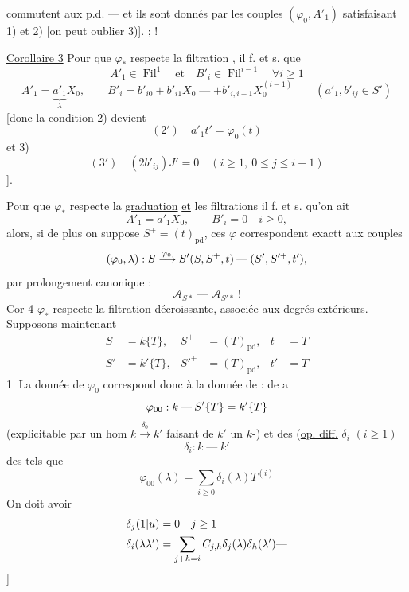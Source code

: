 commutent aux p.d. --- et ils sont donnés par les couples $(\varphi_0,A'_1)$ satisfaisant 1) et 2) [on peut oublier 3)]. ;  !

\uline{Corollaire 3} Pour que $\varphi_*$ respecte la filtration , il f. et s. que
\[
 A'_1\in\operatorname{Fil}^{1}\quad\text{et}\quad B'_i\in\operatorname{Fil}^{i-1}\quad\forall i\geq1
\]
\[
 A'_1=\underbrace{a'_1}_{\lambda}X_0,\qquad
 B'_i=b'_{i0}+b'_{i1}X_0\mathbin{\text{---}}+b'_{i,i-1}X_0^{(i-1)}
 \qquad(a'_1,b'_{ij}\in S')
\]
[donc la condition 2) devient
\[
 (2')\quad a'_1t'=\varphi_0(t)
\]
et 3)
\[
 (3')\quad(2b'_{ij})J'=0\quad(i\geq1,\ 0\leq j\leq i-1)
\]
].

Pour que $\varphi_*$ respecte la \uline{graduation} \uline{et} les filtrations il f. et s. qu'on ait
\[
 A'_1=a'_1X_0,\qquad B'_i=0\quad i\geq0,
\]
alors, si de plus on suppose $S^+=(t)_{\mathrm{pd}}$, ces $\varphi$ correspondent exactt aux couples
\[
 (\varphi_0,\lambda):{{S\xrightarrow{\varphi_0}S'}}{(S,S^+,t)\mathbin{\text{---}}(S',S'^+,t')},
\]
par prolongement canonique :
\[
 \mathcal A_{S*}\mathbin{\text{---}}\mathcal A_{S'*}\ !
\]
\uline{Cor 4} $\varphi_*$ respecte  la filtration \uline{décroissante}, associée aux degrés extérieurs.
Supposons maintenant
\[
 \begin{aligned}
 S&=k\{T\},&S^+&=(T)_{\mathrm{pd}},&t&=T\\
 S'&=k'\{T\},&S'^+&=(T)_{\mathrm{pd}},&t'&=T
 \end{aligned}
\]
\textcircled{1} La donnée de $\varphi_0$ correspond donc à la donnée de :
de \textcircled{a}
\[
 \varphi_{00}:k\mathbin{\text{---}}S'{{\{T\}}}=k'\{T\}
\]
(explicitable par un hom $k\xrightarrow{\delta_0}k'$ faisant de $k'$ un $k$-) et des (\uline{op. diff.} $\delta_i$ $(i\geq1)$
\[
 \delta_i:k\mathbin{\text{---}}k'
\]
des tels que
\[
 \varphi_{00}(\lambda)=\sum_{i\geq0}\delta_i(\lambda)T^{(i)}
\]
On doit avoir
\[
 \begin{aligned}
 \delta_j({1|u})&=0\quad j\geq1\\
 \delta_i(\lambda\lambda')&=\sum_{j+h=i}{C_{j,h}}\delta_j(\lambda)\delta_h(\lambda')\mathbin{\text{---}}
 \end{aligned}
\]
]

